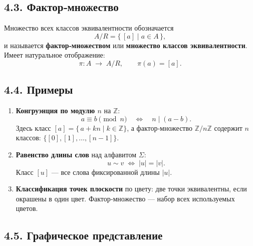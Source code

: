 \documentclass{article}
\begin{document}
\subsection*{4.3. Фактор‑множество}

Множество всех классов эквивалентности обозначается
\[
  A / R = \{ \,[a] \mid a\in A\,\},
\]
и называется \textbf{фактор‑множеством} или \textbf{множество классов эквивалентности}. Имеет натуральное отображение:
\[
  \pi\colon A \;\longrightarrow\; A/R,\qquad \pi(a) = [a].
\]

\subsection*{4.4. Примеры}

\begin{enumerate}[label=\arabic*)]
  \item \textbf{Конгруэнция по модулю $n$} на $\mathbb{Z}$:
  \[
    a \equiv b \pmod{n}
    \quad\Longleftrightarrow\quad
    n \mid (a-b).
  \]
  Здесь класс $[a] = \{\,a + kn \mid k\in\mathbb{Z}\}$, а фактор‑множество $\mathbb{Z}/n\mathbb{Z}$ содержит $n$ классов: 
  \(\{[0],[1],\dots,[n-1]\}.\)

  \item \textbf{Равенство длины слов} над алфавитом $\Sigma$:
  \[
    u \sim v \;\Longleftrightarrow\; |u| = |v|.
  \]
  Класс $[u]$ — все слова фиксированной длины $|u|$.

  \item \textbf{Классификация точек плоскости} по цвету: две точки эквивалентны, если окрашены в один цвет. Фактор‑множество — набор всех используемых цветов.
\end{enumerate}

\subsection*{4.5. Графическое представление}

\begin{center}

\end{center}
\end{document}
